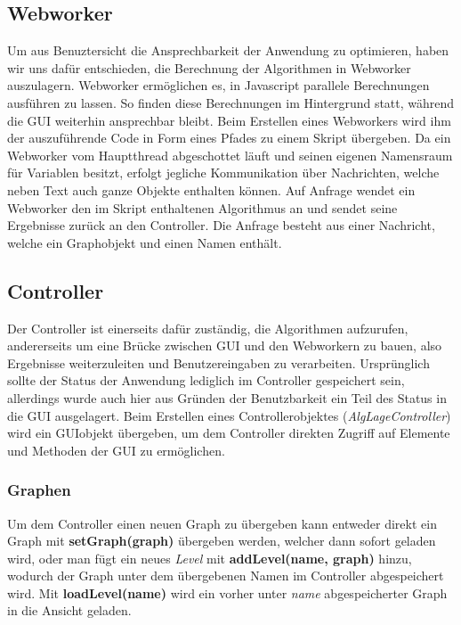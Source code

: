 \documentclass[a4paper,twocolumn]{scrartcl}
\begin{document}
\subsection{Webworker}
Um aus Benuztersicht die Ansprechbarkeit der Anwendung zu optimieren, haben wir uns dafür entschieden, die Berechnung der Algorithmen in Webworker auszulagern. Webworker ermöglichen es, in Javascript parallele Berechnungen ausführen zu lassen. So finden diese Berechnungen im Hintergrund statt, während die GUI weiterhin ansprechbar bleibt.
Beim Erstellen eines Webworkers wird ihm der auszuführende Code in Form eines Pfades zu einem Skript übergeben.
Da ein Webworker vom Hauptthread abgeschottet läuft und seinen eigenen Namensraum für Variablen besitzt, erfolgt jegliche Kommunikation über Nachrichten, welche neben Text auch ganze Objekte enthalten können.
Auf Anfrage wendet ein Webworker den im Skript enthaltenen Algorithmus an und sendet seine Ergebnisse zurück an den Controller. Die Anfrage besteht aus einer Nachricht, welche ein Graphobjekt und einen Namen enthält.

\subsection{Controller}
Der Controller ist einerseits dafür zuständig, die Algorithmen aufzurufen, andererseits um eine Brücke zwischen GUI und den Webworkern zu bauen, also Ergebnisse weiterzuleiten und Benutzereingaben zu verarbeiten.
Ursprünglich sollte der Status der Anwendung lediglich im Controller gespeichert sein, allerdings wurde auch hier aus Gründen der Benutzbarkeit ein Teil des Status in die GUI ausgelagert.
Beim Erstellen eines Controllerobjektes (\emph{AlgLageController}) wird ein GUIobjekt übergeben, um dem Controller direkten Zugriff auf Elemente und Methoden der GUI zu ermöglichen.

\subsubsection{Graphen}
Um dem Controller einen neuen Graph zu übergeben kann entweder direkt ein Graph mit \textbf{setGraph(graph)} übergeben werden, welcher dann sofort geladen wird, oder man fügt ein neues \emph{Level} mit \textbf{addLevel(name, graph)} hinzu, wodurch der Graph unter dem übergebenen Namen im Controller abgespeichert wird. Mit \textbf{loadLevel(name)} wird ein vorher unter \emph{name} abgespeicherter Graph in die Ansicht geladen.
\end{document}
